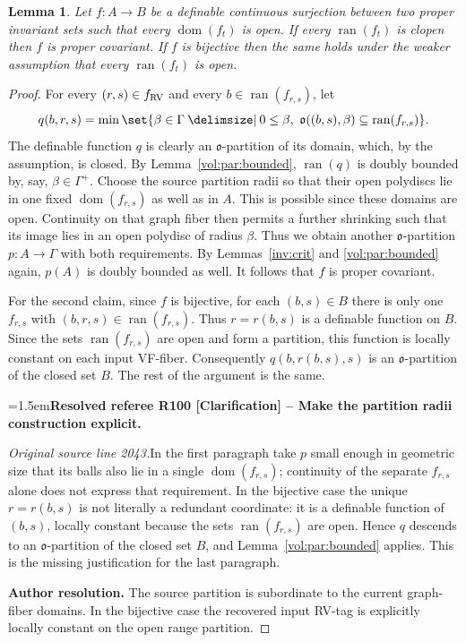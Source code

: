 \documentclass[12pt]{amsart}
\newcommand{\ResolvedRefereeRemark}[5]{%
  \par\medskip\begingroup\normalfont\small\color{gray}%
  \emergencystretch=1.5em\noindent\textbf{Resolved referee R#1 [#2] -- #3.}\par\nobreak\noindent #4\par
  \medskip\color{ResolutionGreen}\noindent\textbf{Author resolution.} #5\par
  \endgroup\medskip
}
\theoremstyle{plain}
\newtheorem{lem}[thm]{Lemma}
\theoremstyle{definition}
\theoremstyle{remark}
\numberwithin{equation}{section}
\theoremstyle{plain}
\newcommand{\RV}{\textup{RV}}
\DeclareMathOperator{\ran}{ran}
\DeclareMathOperator{\dom}{dom}
\newcommand{\go}{\mathfrak{o}}
\newcommand{\0}{\emptyset}
\newcommand{\fun}{\longrightarrow}
\newcommand{\sub}{\subseteq}
\providecommand\given{}
\newcommand\SetSymbol[1][]{%
\nonscript \: #1 \vert
\allowbreak
\nonscript\:
\mathopen{}}
\renewcommand\given{\SetSymbol[\delimsize]}
\begin{document}
\begin{lem}\label{conti:covar}
Let $f : A \fun B$ be a definable continuous surjection between two proper invariant sets such that  every $\dom(f_t)$ is open. If every $\ran(f_t)$ is clopen then $f$ is proper covariant. If $f$ is bijective then the same holds under the weaker assumption that   every $\ran(f_t)$ is open.
\end{lem}
\begin{proof}
For every $(r, s) \in f_{\RV}$ and every $b \in \ran(f_{r,s})$, let
\[
q(b,r,s) = \min\set{\beta \in \Gamma \given 0\leq\beta,\ \go((b,s), \beta) \sub \ran(f_{r,s})}.
\]
The definable function $q$ is clearly an $\go$-partition of its domain, which, by the assumption, is closed. By Lemma~\ref{vol:par:bounded}, $\ran(q)$ is doubly bounded by, say, $\beta \in \Gamma^+$. Choose the source partition radii so that their open polydiscs lie in one fixed $\dom(f_{r,s})$ as well as in $A$. This is possible since these domains are open. Continuity on that graph fiber then permits a further shrinking such that its image lies in an open polydisc of radius $\beta$. Thus we obtain another $\go$-partition $p:A\fun\Gamma$ with both requirements. By Lemmas~\ref{inv:crit} and \ref{vol:par:bounded} again,  $p(A)$ is doubly bounded as well. It follows that $f$ is  proper covariant.

For the second claim, since $f$ is bijective, for each $(b, s) \in B$ there is only one  $f_{r,s}$ with $(b,r, s) \in \ran(f_{r,s})$. Thus $r=r(b,s)$ is a definable function on $B$. Since the sets $\ran(f_{r,s})$ are open and form a partition, this function is locally constant on each input VF-fiber. Consequently $q(b,r(b,s),s)$ is an $\go$-partition of the closed set $B$. The rest of the argument is the same.

\ResolvedRefereeRemark{100}{Clarification}{Make the partition radii construction explicit}{%
\textit{Original source line 2043.}\quad In the first paragraph take $p$ small enough in geometric size that its balls also lie in a single $\dom(f_{r,s})$; continuity of the separate $f_{r,s}$ alone does not express that requirement. In the bijective case the unique $r=r(b,s)$ is not literally a redundant coordinate: it is a definable function of $(b,s)$, locally constant because the sets $\ran(f_{r,s})$ are open. Hence $q$ descends to an $\go$-partition of the closed set $B$, and Lemma~\ref{vol:par:bounded} applies. This is the missing justification for the last paragraph.
}{The source partition is subordinate to the current graph-fiber domains. In the bijective case the recovered input RV-tag is explicitly locally constant on the open range partition.}
\end{proof}
\end{document}
